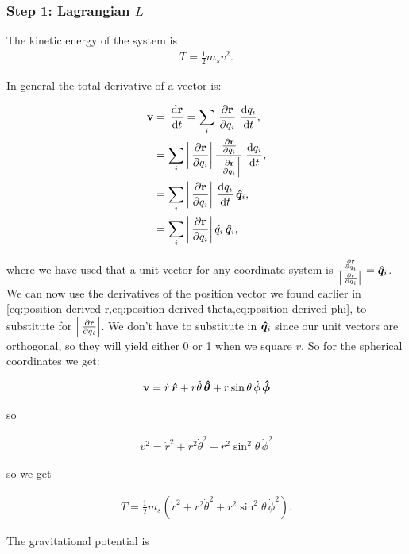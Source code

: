 \subsubsection{Step 1: Lagrangian \(L\)}
The kinetic energy of the system is
\begin{align}
    T = \frac{1}{2} m_s v^2.
\end{align}

In general the total derivative of a vector is:

\begin{align}
    \mathbf{v} &= \operatorname{}\frac{\mathrm{d} \mathbf{r}}{\mathrm{d} t} = \sum\limits_{i} \operatorname{}\frac{\partial \mathbf{r}}{\partial q_i} \operatorname{}\frac{\mathrm{d} q_i}{\mathrm{d} t}, \\
      &= \sum\limits_{i} \left|\operatorname{}\frac{\partial \mathbf{r}}{\partial q_i}\right| \frac{\operatorname{}\frac{\partial \mathbf{r}}{\partial q_i}}{\left|\operatorname{}\frac{\partial \mathbf{r}}{\partial q_i}\right|} \operatorname{}\frac{\mathrm{d} q_i}{\mathrm{d} t}, \\
      &= \sum\limits_{i} \left|\operatorname{}\frac{\partial \mathbf{r}}{\partial q_i}\right| \operatorname{}\frac{\mathrm{d} q_i}{\mathrm{d} t} \operatorname{}\!\bm{\hat{q}}_i, \\
      &= \sum\limits_{i} \left|\operatorname{}\frac{\partial \mathbf{r}}{\partial q_i}\right| \dot{q_i} \operatorname{}\!\bm{\hat{q}}_i,
    \end{align}

where we have used that a unit vector for any coordinate system is \(\frac{\operatorname{}\frac{\partial \mathbf{r}}{\partial q_i}}{\left|\operatorname{}\frac{\partial \mathbf{r}}{\partial q_i}\right|} = \operatorname{}\!\bm{\hat{q}}_i\).
We can now use the derivatives of the position vector we found earlier in \cref{eq:position-derived-r,eq:position-derived-theta,eq:position-derived-phi}, to substitute for \(\left|\operatorname{}\frac{\partial \mathbf{r}}{\partial q_i}\right|\). We don't have to substitute in \(\operatorname{}\!\bm{\hat{q}}_i\) since our unit vectors are orthogonal, so they will yield either 0 or 1 when we square \(v\). So for the spherical coordinates we get:

\begin{align}
    \mathbf{v} = \dot{r}\operatorname{}\!\bm{\hat{r}} + r\dot{\theta}\operatorname{}\!\bm{\hat{\theta}} + r\sin{\theta}\,\dot{\phi}\operatorname{}\!\bm{\hat{\phi}}
\end{align}

so

\begin{align}
    v^2 = \dot{r}^2 + r^2\dot{\theta}^2 + r^2\sin^2{\theta}\,\dot{\phi}^2
\end{align}

so we get

\begin{align}
    T = \frac{1}{2} m_s (\dot{r}^2 + r^2\dot{\theta}^2 + r^2\sin^2{\theta}\,\dot{\phi}^2).
\end{align}

The gravitational potential is 

